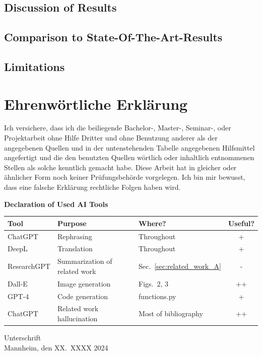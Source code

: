 \documentclass[a4paper,oneside,bibliography=totoc]{scrbook}
\begin{document}
\section{Discussion of Results}

\section{Comparison to State-Of-The-Art-Results}

\section{Limitations}




\appendix

\backmatter
\chapter{Ehrenwörtliche Erklärung}

Ich versichere, dass ich die beiliegende Bachelor-, Master-, Seminar-, oder
Projektarbeit ohne Hilfe Dritter und ohne Benutzung anderer als der angegebenen
Quellen und in der untenstehenden Tabelle angegebenen Hilfsmittel angefertigt
und die den benutzten Quellen wörtlich oder inhaltlich entnommenen Stellen als
solche kenntlich gemacht habe. Diese Arbeit hat in gleicher oder ähnlicher Form
noch keiner Prüfungsbehörde vorgelegen. Ich bin mir bewusst, dass eine falsche
Erklärung rechtliche Folgen haben wird.

\begin{center}
  \textbf{Declaration of Used AI Tools} \\[.3em]
  \begin{tabularx}{\textwidth}{lXlc}
    \toprule
    Tool & Purpose & Where? & Useful? \\
    \midrule
    ChatGPT & Rephrasing & Throughout & + \\
    DeepL & Translation & Throughout & + \\
    ResearchGPT & Summarization of related work & Sec.~\ref{sec:related_work_A} & - \\
    Dall-E & Image generation & Figs.~2, 3 & ++ \\
    GPT-4 & Code generation & functions.py & + \\
    ChatGPT & Related work hallucination & Most of bibliography & ++ \\
    \bottomrule
  \end{tabularx}
\end{center}

\vspace{2cm}
\noindent Unterschrift\\
\noindent Mannheim, den XX.~XXXX 2024 \hfill
\end{document}
